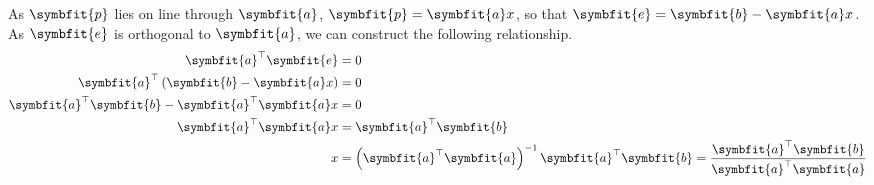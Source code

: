 \documentclass{article}
\begin{document}
\begin{solution}[Proof]
    As \(\symbfit{p}\) lies on line through
    \(\symbfit{a}\), \(\symbfit{p}=\symbfit{a}x\), so that
    \(\symbfit{e}=\symbfit{b}-\symbfit{a}x\). As \(\symbfit{e}\) is
    orthogonal to \(\symbfit{a}\), we can construct the following
    relationship.
    \begin{align*}
        \symbfit{a}^\top \symbfit{e}                                 & = 0                                                                                                                                                \\
        \symbfit{a}^\top \left( \symbfit{b} - \symbfit{a}x \right)   & = 0                                                                                                                                                \\
        \symbfit{a}^\top \symbfit{b} - \symbfit{a}^\top \symbfit{a}x & = 0                                                                                                                                                \\
        \symbfit{a}^\top \symbfit{a}x                                & = \symbfit{a}^\top \symbfit{b}                                                                                                                     \\
        x                                                            & = \left( \symbfit{a}^\top \symbfit{a} \right)^{-1}\symbfit{a}^\top \symbfit{b} = \frac{\symbfit{a}^\top \symbfit{b}}{\symbfit{a}^\top \symbfit{a}}
    \end{align*}
\end{solution}
\end{document}

